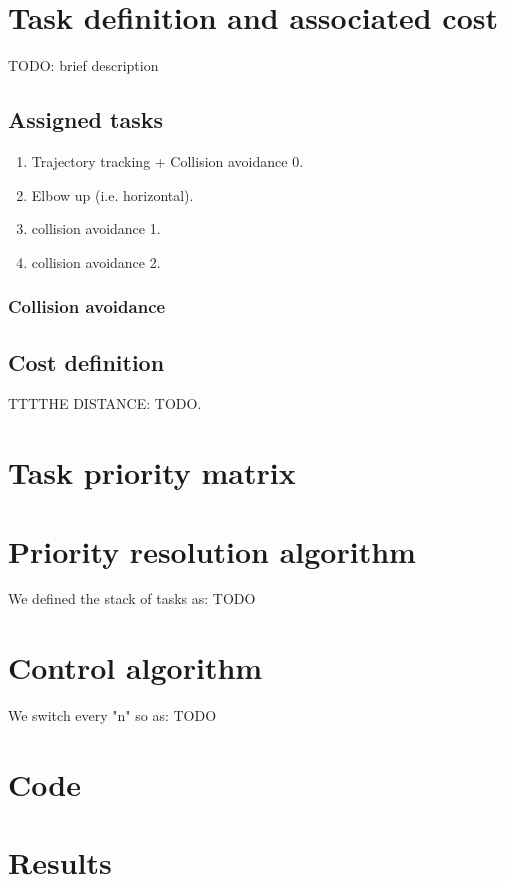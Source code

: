 \documentclass[12pt,a4paper, twocolumn, twoside]{article}
\begin{document}
\section{Task definition and associated cost}
TODO: brief description
\subsection{Assigned tasks}
\begin{enumerate}
	\item Trajectory tracking + Collision avoidance 0.
	\item Elbow up (i.e. horizontal).
	\item collision avoidance 1.
	\item collision avoidance 2.
\end{enumerate}
\subsubsection{Collision avoidance}
\subsection{Cost definition}
TTTTHE DISTANCE: TODO.
\section{Task priority matrix}

\section{Priority resolution algorithm}
We defined the stack of tasks as: TODO
\section{Control algorithm}
We switch every "n" so as: TODO
\section{Code}
\section{Results}
\tableofcontents
\end{document}
